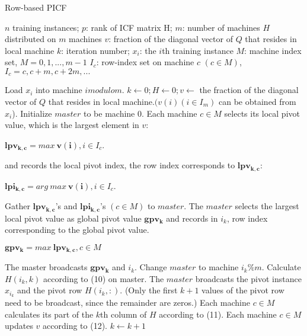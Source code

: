 \documentclass[12pt]{article}
\begin{document}
\begin{algorithm}
\caption{Row-based PICF}
\begin{algorithmic} [1]

 $n$ training instances; $p$: rank of ICF matrix H; $m$: number of machines
 $H$ distributed on $m$ machines
\STATEx $v$: fraction of the diagonal vector of $Q$ that resides in local machine
\STATEx $k$: iteration number;
\STATEx $x_{i}$: the $i$th training instance
\STATEx $M$: machine index set, $M = {0,1,...,m - 1}$
\STATEx $I_{c}$: row-index set on machine $c$ $(c \in M)$, $I_{c} = {c,c + m,c + 2m,...}$

\STATE Load $x_{i}$ into machine $imodulom$.
\ENDFOR
\STATE $k \leftarrow 0; H \leftarrow 0; v \leftarrow$  the fraction of the diagonal vector of $Q$ that resides in local machine.$ (v(i)(i \in I_{m})$ can be obtained from $x_{i}$).
\STATE Initialize $master$ to be machine $0$.
\STATE Each machine $c \in M$ selects its local pivot value, which is the largest element in $v$:
\STATEx \centerline{$\bm{lpv_{k,c}} =max\ \bm{v(i)}, i\in I_{c}$.}
\STATEx and records the local pivot index, the row index corresponds to $\bm{lpv_{k,c}}$:
\Statex  \centerline{$\bm{lpi_{k,c}} =arg\ max\ \bm{v(i)}, i\in I_{c}$.}
\STATE Gather $\bm{lpv_{k,c}}$’s and $\bm{lpi_{k,c}}$’s $(c \in M)$ to $master$.
\STATE The $master$ selects the largest local pivot value as global pivot value $\bm{gpv_{k}}$ and records in $i_{k}$, row index corresponding to the global pivot value.
\Statex  \centerline{$\bm{gpv_{k}} =max\ \bm{lpv_{k,c}},  c \in M$}
\STATE The master broadcasts $\bm{gpv_{k}}$ and $i_{k}$.
\STATE Change $master$ to machine $i_{k}\%m$.
\STATE Calculate $H(i_{k}, k)$ according to (10) on master.
\STATE The $master$ broadcasts the pivot instance $x_{i_{k}}$ and the pivot row $H(i_{k},:)$. (Only the first $k+1$ values of the pivot row need to be broadcast, since the remainder are zeros.)
\STATE Each machine $c \in M$ calculates its part of the $k$th column of $H$ according to (11).
\STATE Each machine $c \in M$ updates $v$ according to (12).
\STATE $k \leftarrow k+1$
\ENDWHILE
\end{algorithmic}
\end{algorithm}


\cleardoublepage
\end{document}
